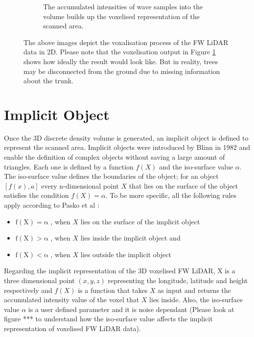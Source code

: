 \documentclass{subfiles}
\begin{document}
\begin{figure} [h!]
\begin{subfigure}[t]{.31\textwidth}
	\caption{The accumulated intensities of wave samples into the volume builds up the voxelised representation of the scanned area.} 
	\label{fig:VoxelisationC_voxelised}
\end{subfigure}
\caption[Voxelisation of FW LiDAR data]{The above images depict the voxalisation process of the FW LiDAR data in 2D. Please note that the voxelisation output in Figure \ref{fig:VoxelisationC_voxelised} shows how ideally the result would look like. But in reality, trees may be disconnected from the ground due to missing information about the trunk.}
\label{fig:Voxelisation}
\end{figure}


\section{Implicit Object}

\par Once the 3D discrete density volume is generated, an implicit object is defined to represent the scanned area. Implicit objects were introduced by Blinn in 1982 \cite{Blinn1982} and enable the definition of complex objects without saving a large amount of triangles. Each one is defined by a function $ \mathit{f(X)} $ and the iso-surface value $\alpha$. The iso-surface value defines the boundaries of the object; for an object $ [f(x),a]$ every n-dimensional point $ \mathit{X} $  that lies on the surface of the object satisfies the condition $ \mathit{f(X)=\alpha }  $. To be more specific, all the following rules apply according to Pasko et al \cite{Pasko1994}: 
\begin{itemize}
	\item $	\mathrm{f(X) = \alpha }$ , when $X$ lies on the surface of the implicit object
	\item $	\mathrm{f(X) > \alpha }$ , when $X$ lies inside the implicit object and
	\item $	\mathrm{f(X) < \alpha }$ , when $X$ lies outside the implicit object	 
\end{itemize}


\par Regarding the implicit representation of the 3D voxelised FW LiDAR, X is a three dimensional point $\mathit{(x, y, z) }$ representing the longitude, latitude and height respectively and ${f(X)}$ is a function that takes  $\mathit{X}$ as input and returns the accumulated intensity value of the voxel that  $\mathit{X}$ lies inside. Also, the iso-surface value $\mathit{\alpha }$ is a user defined parameter and it is noise dependant (Please look at figure *** to understand how the iso-surface value affects the implicit representation of voxelised FW LiDAR data). 
\end{document}
